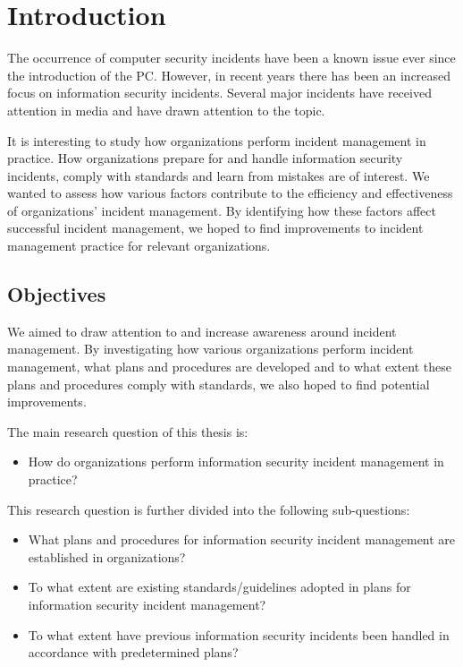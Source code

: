 \chapter{Introduction}
\label{chp:introduction}
The occurrence of computer security incidents have been a known issue ever since the introduction of the PC. However, in recent years there has been an increased focus on information security incidents. Several major incidents have received attention in media and have drawn attention to the topic. %

It is interesting to study how organizations perform incident management in practice. How organizations prepare for and handle information security incidents, comply with standards and learn from mistakes are of interest. We wanted to assess how various factors contribute to the efficiency and effectiveness of organizations' incident management. By identifying how these factors affect successful incident management, we hoped to find improvements to incident management practice for relevant organizations. 



\section{Objectives}
\label{sec:objectives}
We aimed to draw attention to and increase awareness around incident management. By investigating how various organizations perform incident management, what plans and procedures are developed and to what extent these plans and procedures comply with standards, we also hoped to find potential improvements.

The main research question of this thesis is:
\begin{itemize}
\item How do organizations perform information security incident management in practice?
\end{itemize}

This research question is further divided into the following sub-questions:

\begin{itemize}\itemsep-0.1cm
\item What plans and procedures for information security incident management are established in organizations?
\item To what extent are existing standards/guidelines adopted in plans for information security incident management?
\item To what extent have previous information security incidents been handled in accordance with predetermined plans? 
\end{itemize}

